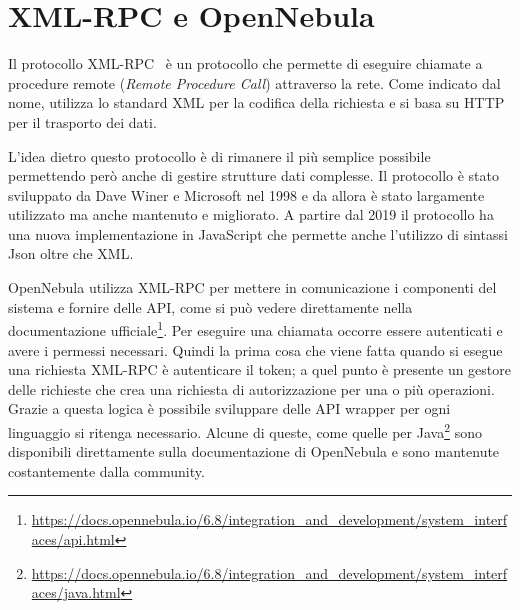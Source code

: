 \section{XML-RPC e OpenNebula}
Il protocollo XML-RPC~\cite{xmlrpc} è un protocollo che permette di eseguire chiamate a procedure remote (\emph{Remote Procedure Call}) attraverso la rete. Come indicato dal nome, utilizza lo standard XML per la codifica della richiesta e si basa su HTTP per il trasporto dei dati.\par
L'idea dietro questo protocollo è di rimanere il più semplice possibile permettendo però anche di gestire strutture dati complesse. Il protocollo è stato sviluppato da Dave Winer e Microsoft nel 1998 e da allora è stato largamente utilizzato ma anche mantenuto e migliorato.
A partire dal 2019 il protocollo ha una nuova implementazione in JavaScript che permette anche l'utilizzo di sintassi Json oltre che XML.\par
OpenNebula utilizza XML-RPC per mettere in comunicazione i componenti del sistema e fornire delle API, come si può vedere direttamente nella documentazione ufficiale\footnote{\url{https://docs.opennebula.io/6.8/integration\_and\_development/system\_interfaces/api.html}}. Per eseguire una chiamata occorre essere autenticati e avere i permessi necessari. Quindi la prima cosa che viene fatta quando si esegue una richiesta XML-RPC è autenticare il token; a quel punto è presente un gestore delle richieste che crea una richiesta di autorizzazione per una o più operazioni. Grazie a questa logica è possibile sviluppare delle API wrapper per ogni linguaggio si ritenga necessario. Alcune di queste, come quelle per Java\footnote{\url{https://docs.opennebula.io/6.8/integration\_and\_development/system\_interfaces/java.html}} sono disponibili direttamente sulla documentazione di OpenNebula e sono mantenute costantemente dalla community.